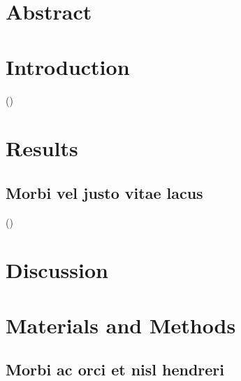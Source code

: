 \documentclass[letterpaper,8pt]{extarticle}  %
\title{\lipsum[1][1]}
\author{%
\textbf{Name \orcidlink{0000-0001-2345-6798},\textcolor{Accent}{\textsuperscript{1}} %
Name \orcidlink{0000-0001-2345-6798},\textcolor{Accent}{\textsuperscript{1}} %
Name\orcidlink{0000-0001-2345-6789}\textcolor{Accent}{\textsuperscript{1,2,*}} }\\
\begin{small}\textcolor{Accent}{\textsuperscript{1}}Your affiliation(s) \\ 
\textcolor{Accent}{\textsuperscript{2}}Lead Contact \\
\textcolor{Accent}{\textsuperscript{*}}Correspondence: \textcolor{Accent}{you@gmail.com} \\ \end{small}
}
\date{}
\begin{document}
\maketitle
\thispagestyle{empty}


\section{Abstract}

\begin{doublespacing}
\begin{linenumbers}

\noindent
\textbf{\textcolor{Accent}{\lipsum[1]}}

\section{Introduction}
\lipsum[2] ()

\lipsum[3]\citep{Schindelin2012}

\lipsum[4]
\section{Results}

\subsection{Morbi vel justo vitae lacus}
\lipsum[5-8] ()
\section{Discussion}
\lipsum[9-11]

\section{Materials and Methods}

\subsection{Morbi ac orci et nisl hendreri}
\lipsum[12]

\end{linenumbers}
\end{doublespacing}
\end{document}
